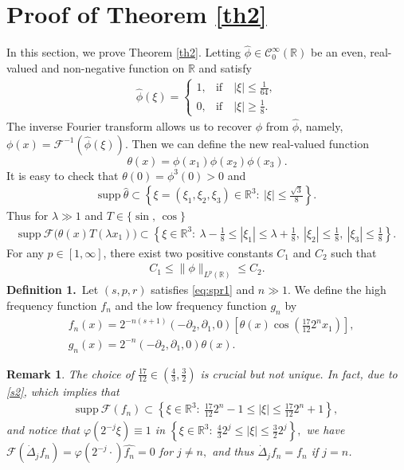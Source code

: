 \documentclass[12pt]{article}
\newtheorem{remark}{Remark}[section]
\newcommand{\bal}{\begin{align}}
\newcommand{\bbal}{\begin{align*}}
\newcommand{\pa}{\partial}
\newcommand{\fr}{\frac}
\newcommand{\R}{\mathbb{R}}
\newcommand{\f}{\left}
\newcommand{\g}{\right}
\begin{document}
\section{Proof of Theorem \ref{th2}}\label{sec3}

In this section, we prove Theorem \ref{th2}.
Letting $\widehat{\phi}\in \mathcal{C}^\infty_0(\mathbb{R})$ be an even, real-valued and non-negative function on $\R$ and satisfy
\begin{align*}
{\widehat{\phi}(\xi)=}\begin{cases}
1,&\text{if}\quad |\xi|\leq \frac{1}{64},\\
0,&\text{if}\quad |\xi|\geq \frac{1}{8}.
\end{cases}
\end{align*}
The inverse Fourier transform allows us to recover $\phi$ from $\widehat{\phi}$, namely, $\phi(x)=\mathcal{F}^{-1}(\widehat{\phi}(\xi))$. Then we can define the new real-valued function
$$\theta(x)=\phi(x_1)\phi(x_2)\phi(x_3).$$
It is easy to check that $\theta(0)=\phi^3(0)>0$ and
\bal\label{s1}
\mathrm{supp} \ \widehat{\theta}\subset \left\{\xi=(\xi_1,\xi_2,\xi_3)\in\R^3: \ |\xi|\leq  \frac{\sqrt{3}}{8}\right\}.
\end{align}
Thus for $\lambda\gg1$ and $T\in\{\sin,\,\cos\}$
\bal\label{s2}
\mathrm{supp} \ \mathcal{F}\Big(\theta(x)T(\lambda x_1)\Big)\subset \left\{\xi\in\R^3: \ \lambda-\fr18\leq|\xi_1|\leq \lambda+\frac{1}{8},\ |\xi_2|\leq \frac{1}{8},\ |\xi_3|\leq\frac{1}{8} \right\}.
\end{align}
For any $p\in[1,\infty]$, there exist two positive constants $C_1$ and $C_2$ such that
\begin{align*}
C_1\leq\|\phi\|_{L^p(\R)}\leq C_2.
\end{align*}
{\bf Definition 1.}\, Let $(s,p,r)$ satisfies \eqref{eq:spr1} and $n\gg1$. We define the high frequency function $f_n$ and the low frequency function $g_n$ by
\bbal
&f_n(x)=2^{-n(s+1)}
\f(-\pa_2,\pa_1,0\g)
\f[\theta(x)\cos \f(\frac{17}{12}2^nx_1\g)\g],\\
&g_n(x)=2^{-n}
\f(-\pa_2,\pa_1,0\g)\theta(x).
\end{align*}
\begin{remark}\label{100} The choice of $\frac{17}{12}\in(\frac{4}{3},\frac{3}{2})$ is crucial but not unique. In fact,
due to \eqref{s2}, which implies that
\bbal
\mathrm{supp}\ \mathcal{F}\f(f_n\g)\subset \left\{\xi\in\R^3: \ \frac{17}{12}2^n-1\leq |\xi|\leq \frac{17}{12}2^n+1\right\},
\end{align*}
and notice that
$
\varphi(2^{-j}\xi)\equiv 1$ in $\left\{\xi\in\R^3: \ \frac{4}{3}2^{j}\leq |\xi|\leq \frac{3}{2}2^{j}\right\},
$
we have
$
\mathcal{F}(\dot{\Delta}_jf_n)=\varphi(2^{-j}\cdot)\widehat{f_n}=0$ for  $j\neq n,
$
and thus
$
\dot{\Delta}_jf_n=
f_n$ if $j=n$.
\end{remark}
\end{document}
